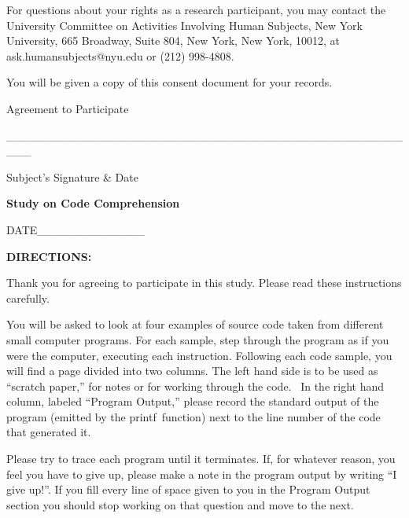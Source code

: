 \documentclass[12pt, a4paper, oneside]{article}
\begin{document}
For questions about your rights as a research participant, you may
contact the University Committee on Activities Involving Human Subjects,
New York University, 665 Broadway, Suite 804, New York, New York, 10012,
at ask.humansubjects@nyu.edu or (212) 998-4808.

You will be given a copy of this consent document for your records.

\vspace{20pt}

Agreement to Participate

\vspace{20pt}

{\_\_\_\_\_\_\_\_\_\_\_\_\_\_\_\_\_\_\_\_\_\_\_\_\_\_\_\_\_\_\_\_\_\_\_\_\_\_\_\_\_\_\_\_\_\_\_\_\_\_\_}

Subject's Signature \& Date

\pagebreak

\begin{center}\textbf{Study on Code Comprehension}\end{center}

\vspace{20pt}

DATE\_\_\_\_\_\_\_\_\_\_\_\_\_

\vspace{20pt}

\textbf{DIRECTIONS:}

{Thank you for agreeing to participate in this study. Please read these
instructions carefully.}

{You will be asked to look at four examples of source code taken from
different small computer programs. For each sample, }{step through the
program as if you were the computer, executing each instruction.
Following each code sample, you will find a page divided into two
columns. The left hand side is to be used as ``scratch paper,'' for
notes or for working through the code. ~In the right hand column,
labeled ``Program Output,'' please record the standard output of the
program (emitted by the }{printf}{~function) next to the line number of
the code that generated it.}

Please try to trace each program until it terminates. If, for whatever reason, you feel you have to give up, please make a note in the program output by writing “I give up!”. If you fill every line of space given to you in the Program Output section you should stop working on that question and move to the next.
\end{document}
